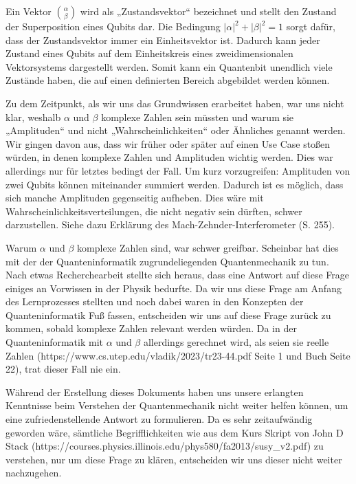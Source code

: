 Ein Vektor $\binom{\alpha}{\beta}$ wird als „Zustandsvektor“ bezeichnet und stellt den Zustand der Superposition eines Qubits dar. Die Bedingung $\left|\alpha\right|^2+\left|\beta\right|^2=1$ sorgt dafür, dass der Zustandsvektor immer ein Einheitsvektor ist. Dadurch kann jeder Zustand eines Qubits auf dem Einheitskreis eines zweidimensionalen Vektorsystems dargestellt werden. Somit kann ein Quantenbit unendlich viele Zustände haben, die auf einen definierten Bereich abgebildet werden können. 

\begin{tcolorbox}[title=Kommentar,
    title filled=false,
    colback=cyan!5!white,
    colframe=cyan!75!black]
Zu dem Zeitpunkt, als wir uns das Grundwissen erarbeitet haben, war uns nicht klar, weshalb $\alpha$ und $\beta$ komplexe Zahlen sein müssten und warum sie „Amplituden“ und nicht „Wahrscheinlichkeiten“ oder Ähnliches genannt werden. Wir gingen davon aus, dass wir früher oder später auf einen Use Case stoßen würden, in denen komplexe Zahlen und Amplituden wichtig werden. Dies war allerdings nur für letztes bedingt der Fall. Um kurz vorzugreifen: Amplituden von zwei Qubits können miteinander summiert werden. Dadurch ist es möglich, dass sich manche Amplituden gegenseitig aufheben. Dies wäre mit Wahrscheinlichkeitsverteilungen, die nicht negativ sein dürften, schwer darzustellen. Siehe dazu Erklärung des Mach-Zehnder-Interferometer (S. 255).

Warum $\alpha$ und $\beta$ komplexe Zahlen sind, war schwer greifbar. Scheinbar hat dies mit der der Quanteninformatik zugrundeliegenden Quantenmechanik zu tun. Nach etwas Recherchearbeit stellte sich heraus, dass eine Antwort auf diese Frage einiges an Vorwissen in der Physik bedurfte. Da wir uns diese Frage am Anfang des Lernprozesses stellten und noch dabei waren in den Konzepten der Quanteninformatik Fuß fassen, entscheiden wir uns auf diese Frage zurück zu kommen, sobald komplexe Zahlen relevant werden würden. Da in der Quanteninformatik mit $\alpha$ und $\beta$ allerdings gerechnet wird, als seien sie reelle Zahlen (https://www.cs.utep.edu/vladik/2023/tr23-44.pdf Seite 1 und Buch Seite 22), trat dieser Fall nie ein. 

Während der Erstellung dieses Dokuments haben uns unsere erlangten Kenntnisse beim Verstehen der Quantenmechanik nicht weiter helfen können, um eine zufriedenstellende Antwort zu formulieren. Da es sehr zeitaufwändig geworden wäre, sämtliche Begrifflichkeiten wie aus dem Kurs Skript von John D Stack (https://courses.physics.illinois.edu/phys580/fa2013/susy\_v2.pdf) zu verstehen, nur um diese Frage zu klären, entscheiden wir uns dieser nicht weiter nachzugehen.
\end{tcolorbox}

